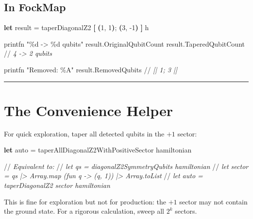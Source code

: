 \documentclass[
  11pt,
  oneside]{book}
\newenvironment{Shaded}{\begin{snugshade}}{\end{snugshade}}
\newcommand{\CommentTok}[1]{\textcolor[rgb]{0.56,0.35,0.01}{\textit{#1}}}
\newcommand{\DecValTok}[1]{\textcolor[rgb]{0.00,0.00,0.81}{#1}}
\newcommand{\KeywordTok}[1]{\textcolor[rgb]{0.13,0.29,0.53}{\textbf{#1}}}
\newcommand{\NormalTok}[1]{#1}
\newcommand{\OperatorTok}[1]{\textcolor[rgb]{0.81,0.36,0.00}{\textbf{#1}}}
\newcommand{\StringTok}[1]{\textcolor[rgb]{0.31,0.60,0.02}{#1}}
\begin{document}
\subsection{In FockMap}\label{in-fockmap-1}

\begin{Shaded}
\begin{Highlighting}[]
\KeywordTok{let}\NormalTok{ result = taperDiagonalZ2 }\OperatorTok{[} \OperatorTok{(}\DecValTok{1}\NormalTok{, }\DecValTok{1}\OperatorTok{)}\NormalTok{; }\OperatorTok{(}\DecValTok{3}\NormalTok{, }\DecValTok{{-}1}\OperatorTok{)} \OperatorTok{]}\NormalTok{ h}

\NormalTok{printfn }\StringTok{"\%d -> \%d qubits"}\NormalTok{ result.OriginalQubitCount result.TaperedQubitCount}
\NormalTok{//}\CommentTok{ 4 -> 2 qubits}

\NormalTok{printfn }\StringTok{"Removed: \%A"}\NormalTok{ result.RemovedQubits}
\NormalTok{//}\CommentTok{ [| 1; 3 |]}
\end{Highlighting}
\end{Shaded}

\begin{center}\rule{0.5\linewidth}{0.5pt}\end{center}

\section{The Convenience Helper}\label{the-convenience-helper}

For quick exploration, taper all detected qubits in the \(+1\) sector:

\begin{Shaded}
\begin{Highlighting}[]
\KeywordTok{let}\NormalTok{ auto = taperAllDiagonalZ2WithPositiveSector hamiltonian}

\NormalTok{//}\CommentTok{ Equivalent to:}
\NormalTok{//}\CommentTok{ let qs = diagonalZ2SymmetryQubits hamiltonian}
\NormalTok{//}\CommentTok{ let sector = qs |\textgreater{} Array.map (fun q {-}\textgreater{} (q, 1)) |\textgreater{} Array.toList}
\NormalTok{//}\CommentTok{ let auto = taperDiagonalZ2 sector hamiltonian}
\end{Highlighting}
\end{Shaded}

This is fine for exploration but not for production: the \(+1\) sector
may not contain the ground state. For a rigorous calculation, sweep all
\(2^k\) sectors.
\end{document}
